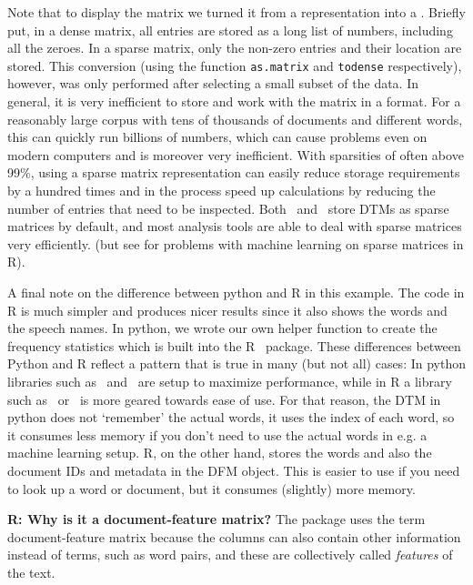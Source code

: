 Note that to display the matrix we turned it from a  representation into a .
Briefly put, in a dense matrix, all entries are stored as a long list of numbers, including all the zeroes.
In a sparse matrix,  only the non-zero entries and their location are stored. 
This conversion (using the function \verb|as.matrix| and \verb|todense| respectively), however, was only performed after selecting a small subset of the data.
In general,  it is very inefficient to store and work with the matrix in a  format.
For a reasonably large corpus with tens of thousands of documents and different words, this can quickly run billions of numbers,
which can cause problems even on modern computers and is moreover very inefficient.
With sparsities of often above 99\%, using a sparse matrix representation can easily reduce storage requirements by a hundred times and in the process speed up calculations by reducing the number of entries that need to be inspected.
Both \quanteda\ and \sklearn\ store DTMs as sparse matrices by default,
and most analysis tools are able to deal with sparse matrices very efficiently.
(but see  for problems with machine learning on sparse matrices in R). 

A final note on the difference between python and R in this example.
The code in R is much simpler and produces nicer results since it also shows the words and the speech names.
In python, we wrote our own helper function to create the frequency statistics which is built into the R \quanteda\ package.
These differences between Python and R reflect a pattern that is true in many (but not all) cases:
In python libraries such as \numpy\ and \sklearn\ are setup to maximize performance,
while in R a library such as \quanteda\ or \tidyverse\ is more geared towards ease of use.
For that reason, the DTM in python does not `remember' the actual words, it uses the index of each word,
so it consumes less memory if you don't need to use the actual words in e.g. a machine learning setup.
R, on the other hand, stores the words and also the document IDs and metadata in the DFM object.
This is easier to use if you need to look up a word or document, but it consumes (slightly) more memory. 


\begin{feature}
  \textbf{R: Why is it a document-feature matrix?}
The package  uses the term document-feature matrix because the columns can also contain
other information instead of terms, such as word pairs, and these are collectively called \emph{features} of the text.
\end{feature}

